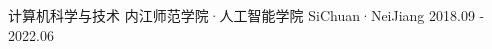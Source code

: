 

\begin{cventries}

  \cventry
    {计算机科学与技术} %
    {内江师范学院·人工智能学院} %
    {SiChuan·NeiJiang} %
    {2018.09 - 2022.06} %
    {}

\end{cventries}
